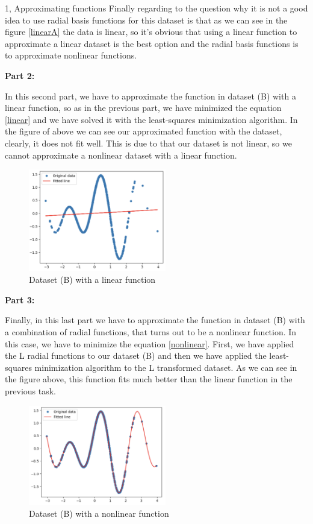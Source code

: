 \documentclass[10pt,a4paper]{article}
\begin{document}
\begin{task}{1, Approximating functions}
Finally regarding to the question why it is not a good idea to use radial basis functions for this dataset is that as we can see in the figure \ref{linearA} the data is linear, so it's obvious that using a linear function to approximate a linear dataset is the best option and the radial basis functions is to approximate nonlinear functions. 

\noindent \textbf{Part 2:} 

In this second part, we have to approximate the function in dataset (B) with a linear function, so as in the previous part, we have minimized the equation \ref{linear} and we have solved it with the least-squares minimization algorithm. In the figure of above we can see our approximated function with the dataset, clearly, it does not fit well. This is due to that our dataset is not linear, so we cannot approximate a nonlinear dataset with a linear function.

\begin{figure}[H]
    \centering
    \includegraphics[width=6cm]{images/linearFunctionB.png}
    \caption{Dataset (B) with a linear function}
    \label{linearB}
\end{figure}

\noindent \textbf{Part 3:} 

Finally, in this last part we have to approximate the function in dataset (B) with a combination of radial functions, that turns out to be a nonlinear function. In this case, we have to minimize the equation \ref{nonlinear}. First, we have applied the L radial functions to our dataset (B) and then we have applied the least-squares minimization algorithm to the L transformed dataset. As we can see in the figure above, this function fits much better than the linear function in the previous task.

\begin{figure}[H]
    \centering
    \includegraphics[width=6cm]{images/nonLinearFunctionB.png}
    \caption{Dataset (B) with a nonlinear function}
    \label{nonLinearB}
\end{figure}


\end{task}
\end{document}
